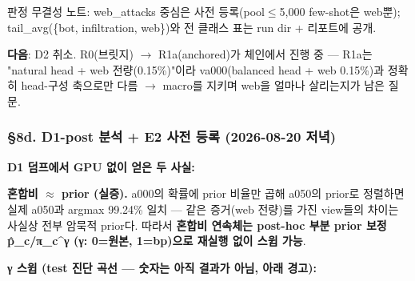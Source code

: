 \par\noindent \textbullet\enspace 판정 무결성 노트: web\_\allowbreak{}attacks 중심은 사전 등록(pool\ensuremath{\leq}5,000 few-shot은 web뿐); tail\_\allowbreak{}avg(\{bot, infiltration, web\})와 전 클래스 표는 run dir +\allowbreak{} 리포트에 공개.


\textbf{다음}: D2 취소. R0(브릿지) \ensuremath{\rightarrow} R1a(anchored)가 체인에서 진행 중 — R1a는 "natural head +\allowbreak{} web 전량(0.15\%)"이라 va000(balanced head +\allowbreak{} web 0.15\%)과 정확히 head-구성 축으로만 다름  \ensuremath{\rightarrow}  macro를 지키며 web을 얼마나 살리는지가 남은 질문.

\subsubsection{§8d. D1-post 분석 +\allowbreak{} E2 사전 등록 (2026-08-20 저녁)}
\textbf{D1 덤프에서 GPU 없이 얻은 두 사실:}

\par\noindent \textbullet\enspace \textbf{혼합비 \ensuremath{\approx} prior (실증).} a000의 확률에 prior 비율만 곱해 a050의 prior로 정렬하면 실제 a050과 argmax 99.24\% 일치 — 같은 증거(web 전량)를 가진 view들의 차이는 사실상 전부 암묵적 prior다. 따라서 \textbf{혼합비 연속체는 post-hoc 부분 prior 보정 p̂\_\allowbreak{}c/\allowbreak{}π\_\allowbreak{}c\textasciicircum{}γ (γ: 0=\allowbreak{}원본, 1=\allowbreak{}bp)으로 재실행 없이 스윕 가능}.


\par\noindent \textbullet\enspace \textbf{γ 스윕 (test 진단 곡선 — 숫자는 아직 결과가 아님, 아래 경고):}


